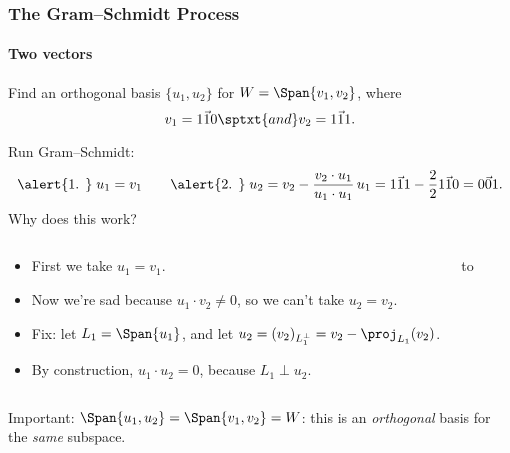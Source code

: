 
\begin{frame}
\frametitle{The Gram--Schmidt Process}
\framesubtitle{Two vectors}

Find an orthogonal basis $\{u_1,u_2\}$ for $W = \Span\{v_1,v_2\}$, where
\displayskips{3pt}
\[ v_1 = \vec{1 1 0} \sptxt{and} v_2 = \vec{1 1 1}. \]

\medskip
\begin{webonly}
Run Gram--Schmidt:\vskip-5mm
\[
  \text{\alert{1. }}\;
  u_1 = v_1 \qquad
  \text{\alert{2. }}\;
  u_2 = v_2 - \frac{v_2\cdot u_1}{u_1\cdot u_1}\,u_1 
  = \vec{1 1 1} - \frac{2}{2}\vec{1 1 0}
  = \vec{0 0 1}.
\]\vskip-3mm
Why does this work?
\end{webonly}%

\begin{columns}[onlytextwidth]
\begin{webonly}%
  \begin{itemize}
  \item First we take $u_1 = v_1$.
  \item Now we're sad because $u_1\cdot v_2\neq 0$, so we can't take $u_2 =
    v_2$.
  \item Fix: let $L_1 = \Span\{u_1\}$, and let
    $u_2 = (v_2)_{L_1^\perp} = v_2 - \proj_{L_1}(v_2)$.
  \item By construction, $u_1\cdot u_2=0$, because $L_1\perp u_2$.
  \end{itemize}
\end{webonly}
\pause
%
\hbox to 
\end{columns}

\pause\medskip
\alert{Important:} $\Span\{u_1,u_2\} = \Span\{v_1,v_2\} = W$: this is an
\emph{orthogonal} basis for the \emph{same\/} subspace.

\end{frame}


